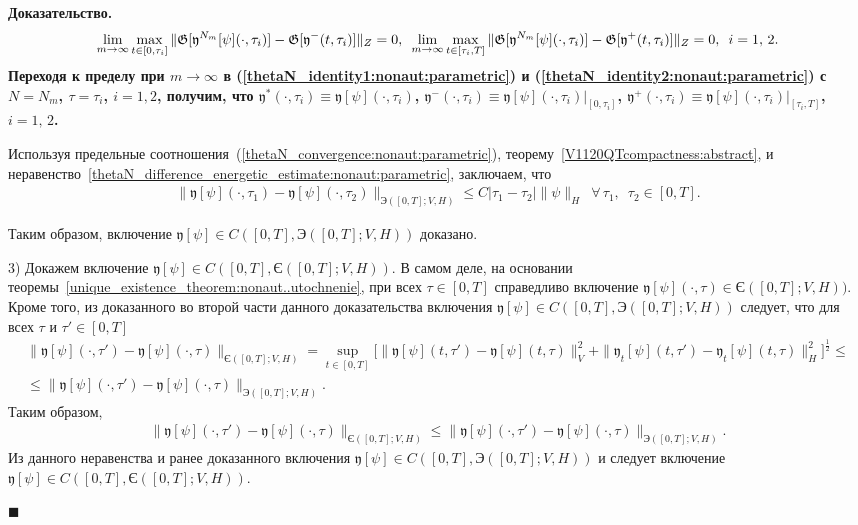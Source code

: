 \documentclass{report}
\newcounter{rem}[section]
\newcounter{theor}[section]
\newenvironment{Proof}{\par\noindent\bf Доказательство.\rm}{ $\blacksquare$\par}
\begin{document}
\begin{Proof}
\begin{gather}
\notag\lim\limits_{m\to\infty}\max\limits_{t\in[0,\tau_i]}
\|\mathfrak{G}[\mathfrak{y}^{N_m}[\psi](\cdot,\tau_i)]-\mathfrak{G}[\mathfrak{y}^-(t,\tau_i)]\|_{Z}=0,\,\,\,
\notag\lim\limits_{m\to\infty}\max\limits_{t\in[\tau_i,T]}
\|\mathfrak{G}[\mathfrak{y}^{N_m}[\psi](\cdot,\tau_i)]-\mathfrak{G}[\mathfrak{y}^+(t,\tau_i)]\|_{Z}=0,\,\,\,\notag i=1,\,2.
\end{gather}
Переходя к пределу при $m\to\infty$ в (\ref{thetaN_identity1:nonaut:parametric}) и (\ref{thetaN_identity2:nonaut:parametric}) с $N=N_m$, $\tau=\tau_i$, $i=1,2$, получим, что $\mathfrak{y}^*(\cdot,\tau_i)\equiv\mathfrak{y}[\psi](\cdot,\tau_i)$, 
$\mathfrak{y}^-(\cdot,\tau_i)\equiv\mathfrak{y}[\psi](\cdot,\tau_i)|_{[0,\tau_i]}$, 
$\mathfrak{y}^+(\cdot,\tau_i)\equiv\mathfrak{y}[\psi](\cdot,\tau_i)|_{[\tau_i,T]}$, $i=1,\,2$.

Используя предельные соотношения~(\ref{thetaN_convergence:nonaut:parametric}), теорему~\ref{V1120QTcompactness:abstract}, и неравенство~\eqref{thetaN_difference_energetic_estimate:nonaut:parametric},  заключаем, что
\begin{gather}
\label{theta_difference_energetic_estimate:nonaut:parametric}
\|\mathfrak{y}[\psi](\cdot,\tau_1)-\mathfrak{y}[\psi](\cdot,\tau_2)\|_{\textrm{Э}([0,T]; V,H)}\leqslant C|\tau_1-\tau_2|\|\psi\|_H\,\,\,\forall\,\tau_1,\,\,\,\tau_2\in[0,T].
\end{gather}

Таким образом, включение $\mathfrak{y}[\psi]\in C([0,T],\textrm{Э}([0,T];V,H))$ доказано.

3) Докажем включение $\mathfrak{y}[\psi]\in C([0,T],\textrm{Є}([0,T];V,H))$. В самом деле, на основании теоремы~\ref{unique_existence_theorem:nonaut..utochnenie}, при всех $\tau\in[0,T]$ справедливо включение $\mathfrak{y}[\psi](\cdot,\tau)\in \textrm{Є}([0,T];V,H))$. Кроме того, из доказанного во второй части данного доказательства включения $\mathfrak{y}[\psi]\in C([0,T],\textrm{Э}([0,T];V,H))$ следует, что для всех $\tau$ и $\tau'\in[0,T]$
\begin{gather*}
\|\mathfrak{y}[\psi](\cdot,\tau')-\mathfrak{y}[\psi](\cdot,\tau)\|_{\textrm{Є}([0,T];V,H)}=\sup\limits_{t\in[0,T]}\biggl[
\|\mathfrak{y}[\psi](t,\tau')-\mathfrak{y}[\psi](t,\tau)\|_V^2+\|\mathfrak{y}_t[\psi](t,\tau')-\mathfrak{y}_t[\psi](t,\tau)\|_H^2\biggr]^{\frac12}\leqslant\\
\leqslant\|\mathfrak{y}[\psi](\cdot,\tau')-\mathfrak{y}[\psi](\cdot,\tau)\|_{\textrm{Э}([0,T];V,H)}.
\end{gather*}
Таким образом,
\begin{gather}\label{EErevnorms:nonaut:parametric}
\|\mathfrak{y}[\psi](\cdot,\tau')-\mathfrak{y}[\psi](\cdot,\tau)\|_{\textrm{Є}([0,T];V,H)}
\leqslant\|\mathfrak{y}[\psi](\cdot,\tau')-\mathfrak{y}[\psi](\cdot,\tau)\|_{\textrm{Э}([0,T];V,H)}.
\end{gather}
Из данного неравенства и ранее доказанного включения $\mathfrak{y}[\psi]\in C([0,T],\textrm{Э}([0,T];V,H))$ и следует включение $\mathfrak{y}[\psi]\in C([0,T],\textrm{Є}([0,T];V,H))$.


\end{Proof}
\end{document}

